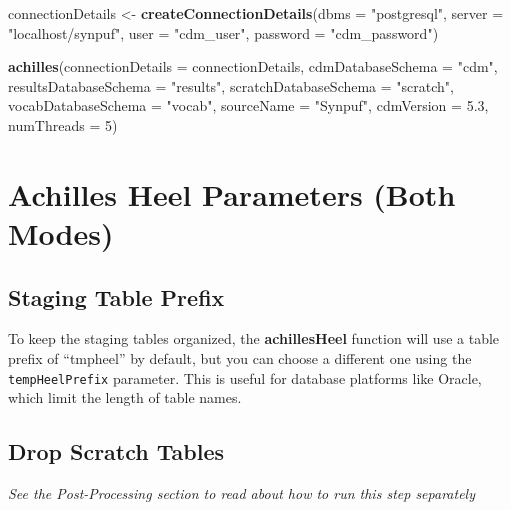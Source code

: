 \documentclass[]{article}
\newenvironment{Shaded}{\begin{snugshade}}{\end{snugshade}}
\newcommand{\KeywordTok}[1]{\textcolor[rgb]{0.13,0.29,0.53}{\textbf{#1}}}
\newcommand{\DataTypeTok}[1]{\textcolor[rgb]{0.13,0.29,0.53}{#1}}
\newcommand{\DecValTok}[1]{\textcolor[rgb]{0.00,0.00,0.81}{#1}}
\newcommand{\FloatTok}[1]{\textcolor[rgb]{0.00,0.00,0.81}{#1}}
\newcommand{\StringTok}[1]{\textcolor[rgb]{0.31,0.60,0.02}{#1}}
\newcommand{\NormalTok}[1]{#1}
\begin{document}
\begin{Shaded}
\begin{Highlighting}[]
\NormalTok{connectionDetails <-}\StringTok{ }\KeywordTok{createConnectionDetails}\NormalTok{(}\DataTypeTok{dbms =} \StringTok{"postgresql"}\NormalTok{, }
                                             \DataTypeTok{server =} \StringTok{"localhost/synpuf"}\NormalTok{, }
                                             \DataTypeTok{user =} \StringTok{"cdm_user"}\NormalTok{, }
                                             \DataTypeTok{password =} \StringTok{"cdm_password"}\NormalTok{)}

\KeywordTok{achilles}\NormalTok{(}\DataTypeTok{connectionDetails =}\NormalTok{ connectionDetails, }
         \DataTypeTok{cdmDatabaseSchema =} \StringTok{"cdm"}\NormalTok{, }
         \DataTypeTok{resultsDatabaseSchema =} \StringTok{"results"}\NormalTok{, }
         \DataTypeTok{scratchDatabaseSchema =} \StringTok{"scratch"}\NormalTok{, }
         \DataTypeTok{vocabDatabaseSchema =} \StringTok{"vocab"}\NormalTok{, }
         \DataTypeTok{sourceName =} \StringTok{"Synpuf"}\NormalTok{, }
         \DataTypeTok{cdmVersion =} \FloatTok{5.3}\NormalTok{, }
         \DataTypeTok{numThreads =} \DecValTok{5}\NormalTok{)}
\end{Highlighting}
\end{Shaded}

\section{Achilles Heel Parameters (Both
Modes)}\label{achilles-heel-parameters-both-modes}

\subsection{Staging Table Prefix}\label{staging-table-prefix-1}

To keep the staging tables organized, the \textbf{achillesHeel} function
will use a table prefix of ``tmpheel'' by default, but you can choose a
different one using the \texttt{tempHeelPrefix} parameter. This is
useful for database platforms like Oracle, which limit the length of
table names.

\subsection{Drop Scratch Tables}\label{drop-scratch-tables-1}

\emph{See the Post-Processing section to read about how to run this step
separately}
\end{document}
